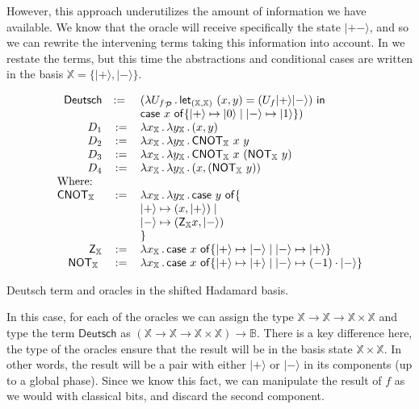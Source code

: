 \documentclass[runningheads,orivec]{llncs}
\newcommand\ket[1]{\ensuremath{|#1\rangle}}
\newcommand\AbsBasis{\ensuremath{\mathcal{P}}}
\def\Pair#1#2{(#1,#2)} %
\def\Lam#1#2#3{\lambda#1_{#2}\,{.}\,#3} %
\def\letkeyword{\mathsf{let}}
\def\inkeyword{\mathsf{in}}
\def\LetP#1#2#3#4#5#6{\letkeyword_{\Pair{#2}{#4}}~\Pair{#1}{#3}=#5~\inkeyword~#6}
\def\case#1#2#3#4#5{\ensuremath{\mathsf{case}~#1~\mathsf{of} \{#2\mapsto #4 \mid #3\mapsto #5\}}}
\newcommand\B{\mathbb B}
\newcommand\XB{\mathbb X}
\newcommand{\pauliZXB}{\mathsf{Z}_{\XB}}
\newcommand{\cnotXB}[2]{\mathsf{CNOT}_{\XB}\ #1\ #2}
\newcommand{\pauliXXB}[1]{\mathsf{NOT}_{\XB}\ #1}
\begin{document}
However, this approach underutilizes the amount of information we have available. We know that the oracle will receive specifically the state $\ket{+-}$, and so we can rewrite the intervening terms taking this information into account. In  we restate the terms, but this time the abstractions and conditional cases are written in the basis $\XB=\{\ket{+},\ket{-}\}$.

\begin{table*}
    \footnotesize
    \[
    \begin{array}{r c l}
        \mathsf{Deutsch}&:=~&(\Lam{{U_f}}{\AbsBasis}{
                \LetP{x}{\XB}{y}{\XB}
                {(U_f \ket{+} \ket{-})}
                {\\ && \case{x}{\ket{+}}{\ket{-}}{\ket{0}}{\ket{1}}}})\\
        D_1 &:= &\Lam{x}{\XB}{\Lam{y}{\XB}{\Pair{x}{y}}}\\
        D_2 &:= &\Lam{x}{\XB}{\Lam{y}{\XB}{\cnotXB{x}{y}}}\\
        D_3 &:= &\Lam{x}{\XB}{\Lam{y}{\XB}{\cnotXB{x}{(\pauliXXB{y})}}}\\
        D_4 &:= &\Lam{x}{\XB}{\Lam{y}{\XB}{\Pair{x}{(\pauliXXB{y})}}}\\
        \multicolumn{3}{l}{\text{Where:}}\\
        \cnotXB{}{} &:=& \Lam{x}{\XB}{\Lam{y}{\XB}{
        \case{y}
        {\\ && \ket{+}}{\\ && \ket{-}}
        {\Pair{x}{\ket{+}}}{\Pair{\pauliZXB{x}}{\ket{-}} \\ &&}}}\\
        \pauliZXB{} &:=& \Lam{x}{\XB}{\case{x}{\ket{+}}{\ket{-}}{\ket{-}}{\ket{+}}}\\
        \pauliXXB{} &:=& \Lam{x}{\XB}{\case{x}{\ket{+}}{\ket{-}}{\ket{+}}{(-1)\cdot \ket{-}}}\\
    \end{array}
    \]
    \caption{Deutsch term and oracles in the shifted Hadamard basis.}
    \label{tab:DeutschShift}
\end{table*}

In this case, for each of the oracles we can assign the type $\XB\to\XB\to\XB\times\XB$ and type the term $\mathsf{Deutsch}$ as $(\XB\to\XB\to\XB\times\XB)\to\B$. There is a key difference here, the type of the oracles ensure that the result will be in the basis state $\XB\times\XB$. In other words, the result will be a pair with either $\ket{+}$ or $\ket{-}$ in its components (up to a global phase). Since we know this fact, we can manipulate the result of $f$ as we would with classical bits, and discard the second component. 
\end{document}
